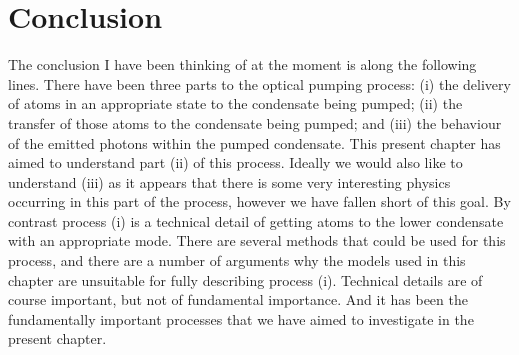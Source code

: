 \section{Conclusion}

The conclusion I have been thinking of at the moment is along the following lines.  There have been three parts to the optical pumping process: (i) the delivery of atoms in an appropriate state to the condensate being pumped; (ii) the transfer of those atoms to the condensate being pumped; and (iii) the behaviour of the emitted photons within the pumped condensate.  This present chapter has aimed to understand part (ii) of this process.  Ideally we would also like to understand (iii) as it appears that there is some very interesting physics occurring in this part of the process, however we have fallen short of this goal.  By contrast process (i) is a technical detail of getting atoms to the lower condensate with an appropriate mode.  There are several methods that could be used for this process, and there are a number of arguments why the models used in this chapter are unsuitable for fully describing process (i).  Technical details are of course important, but not of fundamental importance.  And it has been the fundamentally important processes that we have aimed to investigate in the present chapter.
